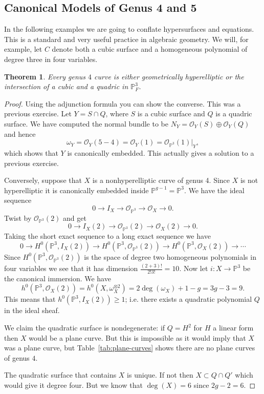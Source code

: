 \documentclass[12pt]{article}
\numberwithin{equation}{section}
\newtheorem{theorem}{Theorem}[subsection]
\theoremstyle{definition}
\theoremstyle{remark}
\newcommand{\Ocal}{\mathcal{O}}
\newcommand{\PP}{\mathbb{P}}
\begin{document}
\subsection{Canonical Models of Genus 4 and 5}
In the following examples we are going to conflate hypersurfaces and equations. 
This is a standard and very useful practice in algebraic geometry. 
We will, for example, let $C$ denote both a cubic surface and a homogeneous polynomial of degree three in four variables.
\begin{theorem}
	Every genus $4$ curve is either geometrically hyperelliptic or the intersection of a cubic and a quadric in $\PP^3_F$. 
\end{theorem}
\begin{proof}
	Using the adjunction formula you can show the converse. 
	This was a previous exercise. 
	Let $Y = S\cap Q$, where $S$ is a cubic surface and $Q$ is a quadric surface. 
	We have computed the normal bundle to be 
	$N_{Y} = \Ocal_Y(S)\oplus \Ocal_Y(Q)$ and hence
	 $$ \omega_Y = \Ocal_Y(5-4)=\Ocal_Y(1) = \Ocal_{\PP^3}(1)\vert_Y,$$
	which shows that $Y$ is canonically embedded. 
	This actually gives a solution to a previous exercise. 
	
	Conversely, suppose that $X$ is a nonhyperelliptic curve of genus 4. 
	Since $X$ is not hyperelliptic it is canonically embedded inside $\PP^{g-1} = \PP^3$. 
	We have the ideal sequence 
	 $$ 0 \to I_X\to \Ocal_{\PP^3} \to \Ocal_X \to 0.$$
	Twist by $\Ocal_{\PP^3}(2)$ and get 
	 $$0 \to I_X(2) \to \Ocal_{\PP^3}(2) \to \Ocal_X(2) \to 0. $$
	Taking the short exact sequence to a long exact sequence we have 
	 $$ 0 \to H^0(\PP^3,I_X(2)) \to H^0(\PP^3,\Ocal_{\PP^3}(2)) \to H^0(\PP^3,\Ocal_X(2)) \to \cdots $$
	 Since $H^0(\PP^3,\Ocal_{\PP^3}(2))$ is the space of degree two homogeneous polynomials in four variables we see that it has dimension $\frac{(2+3)!}{2!3!}=10$.
	 Now let $i:X\to \PP^3$ be the canonical immersion. 
	 We have 
	 $$h^0(\PP^3,\Ocal_X(2)) = h^0(X,\omega_X^{\otimes 2}) = 2 \deg(\omega_X) + 1-g = 3g-3 = 9.$$
	 This means that $h^0(\PP^3,I_X(2))\geq 1$; i.e. there exists a quadratic polynomial $Q$ in the ideal sheaf.
	 
	 We claim the quadratic surface is nondegenerate: if $Q=H^2$ for $H$ a linear form then $X$ would be a plane curve. 
	 But this is impossible as it would imply that $X$ was a plane curve, but Table~\ref{tab:plane-curves} shows there are no plane curves of genus $4$.
	 
	 The quadratic surface that contains $X$ is unique. 
	 If not then $X \subset Q\cap Q'$ which would give it degree four.
	 But we know that $\deg(X)=6$ since $2g-2=6$.
	 

\end{proof}
\end{document}
